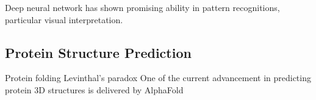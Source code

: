Deep neural network has shown promising ability in pattern recognitions, particular visual interpretation.
\par 

\subsection{Protein Structure Prediction}
Protein folding Levinthal's paradox One of the current advancement in predicting protein 3D structures is delivered by AlphaFold